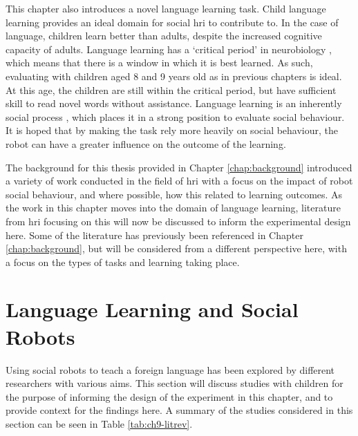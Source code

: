 This chapter also introduces a novel language learning task. Child language learning provides an ideal domain for social \acrshort{hri} to contribute to. In the case of language, children learn better than adults, despite the increased cognitive capacity of adults. Language learning has a `critical period' in neurobiology \citep{kuhl2010brain}, which means that there is a window in which it is best learned. As such, evaluating with children aged 8 and 9 years old as in previous chapters is ideal. At this age, the children are still within the critical period, but have sufficient skill to read novel words without assistance. Language learning is an inherently social process \citep{kuhl2007cracking}, which places it in a strong position to evaluate social behaviour. It is hoped that by making the task rely more heavily on social behaviour, the robot can have a greater influence on the outcome of the \gls{learning}. 

The background for this thesis provided in Chapter \ref{chap:background} introduced a variety of work conducted in the field of \acrshort{hri} with a focus on the impact of robot social behaviour, and where possible, how this related to \gls{learning} outcomes. As the work in this chapter moves into the domain of language learning, literature from \acrshort{hri} focusing on this will now be discussed to inform the experimental design here. Some of the literature has previously been referenced in Chapter \ref{chap:background}, but will be considered from a different perspective here, with a focus on the types of tasks and \gls{learning} taking place.

\section{Language Learning and Social Robots}
Using social robots to teach a foreign language has been explored by different researchers with various aims. This section will discuss studies with children for the purpose of informing the design of the experiment in this chapter, and to provide context for the findings here. A summary of the studies considered in this section can be seen in Table \ref{tab:ch9-litrev}.

